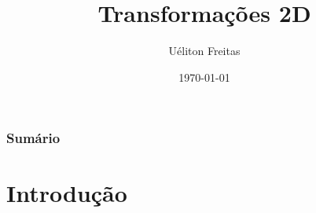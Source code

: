 \documentclass[fleqn]{beamer}
\title[Computação Gráfica]{Transformações 2D} %
\author{Uéliton Freitas} %
\institute[UFMS] %
{
Universidade Católica Don Bosco - UCDB \\ %
\medskip
\textit{freitas.ueliton@gmail.com} %
}
\date{\today} %
\begin{document}
\begin{frame}
\titlepage %
\end{frame}

\begin{frame}
\frametitle{Sumário} %
\tableofcontents %
\end{frame}





\section{Introdução} 

\end{document}
